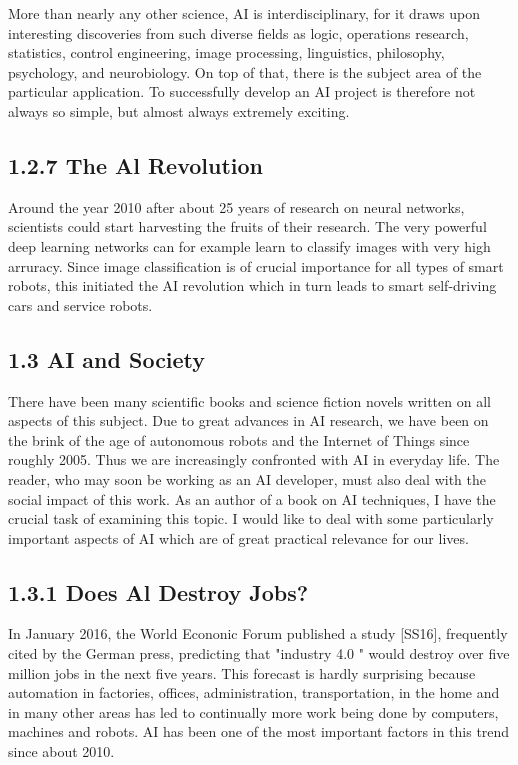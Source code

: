 \documentclass[10pt]{article}
\begin{document}
More than nearly any other science, AI is interdisciplinary, for it draws upon interesting discoveries from such diverse fields as logic, operations research, statistics, control engineering, image processing, linguistics, philosophy, psychology, and neurobiology. On top of that, there is the subject area of the particular application. To successfully develop an AI project is therefore not always so simple, but almost always extremely exciting.

\subsection*{1.2.7 The Al Revolution}
Around the year 2010 after about 25 years of research on neural networks, scientists could start harvesting the fruits of their research. The very powerful deep learning networks can for example learn to classify images with very high arruracy. Since image classification is of crucial importance for all types of smart robots, this initiated the AI revolution which in turn leads to smart self-driving cars and service robots.

\subsection*{1.3 AI and Society}
There have been many scientific books and science fiction novels written on all aspects of this subject. Due to great advances in AI research, we have been on the brink of the age of autonomous robots and the Internet of Things since roughly 2005. Thus we are increasingly confronted with AI in everyday life. The reader, who may soon be working as an AI developer, must also deal with the social impact of this work. As an author of a book on AI techniques, I have the crucial task of examining this topic. I would like to deal with some particularly important aspects of AI which are of great practical relevance for our lives.

\subsection*{1.3.1 Does Al Destroy Jobs?}
In January 2016, the World Econonic Forum published a study [SS16], frequently cited by the German press, predicting that "industry 4.0 " would destroy over five\\
million jobs in the next five years. This forecast is hardly surprising because automation in factories, offices, administration, transportation, in the home and in many other areas has led to continually more work being done by computers, machines and robots. AI has been one of the most important factors in this trend since about 2010.
\end{document}
